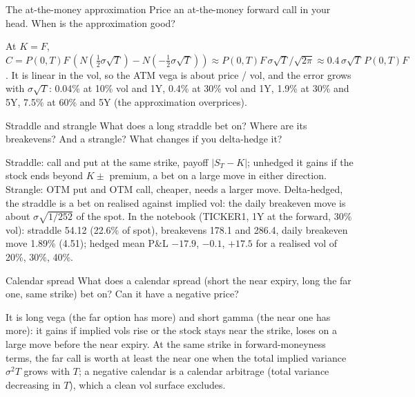 \begin{question}{\Theory \Practice {}}{The at-the-money approximation}
Price an at-the-money forward call in your head. When is the approximation good?
\end{question}
\begin{answer}
At $K = F$, $C = P(0,T)F\,(N(\tfrac12\sigma\sqrt T) - N(-\tfrac12\sigma\sqrt T)) \approx P(0,T)F\,\sigma\sqrt T/\sqrt{2\pi}
\approx 0.4\,\sigma\sqrt T\,P(0,T)F$. It is linear in the vol, so the ATM vega is about price / vol, and the error grows
with $\sigma\sqrt T$: 0.04\% at 10\% vol and 1Y, 0.4\% at 30\% vol and 1Y, 1.9\% at 30\% and 5Y, 7.5\% at 60\% and 5Y
(the approximation overprices).
\end{answer}

\begin{question}{\Theory \Practice {}}{Straddle and strangle}
What does a long straddle bet on? Where are its breakevens? And a strangle? What changes if you delta-hedge it?
\end{question}
\begin{answer}
Straddle: call and put at the same strike, payoff $|S_T - K|$; unhedged it gains if the stock ends beyond
$K \pm$ premium, a bet on a large move in either direction. Strangle: OTM put and OTM call, cheaper, needs a larger move.
Delta-hedged, the straddle is a bet on realised against implied vol: the daily breakeven move is about
$\sigma\sqrt{1/252}$ of the spot. In the notebook (TICKER1, 1Y at the forward, 30\% vol): straddle 54.12 (22.6\% of
spot), breakevens 178.1 and 286.4, daily breakeven move 1.89\% (4.51); hedged mean P\&L $-17.9$, $-0.1$, $+17.5$ for a
realised vol of 20\%, 30\%, 40\%.
\end{answer}

\begin{question}{\Theory {}}{Calendar spread}
What does a calendar spread (short the near expiry, long the far one, same strike) bet on? Can it have a negative
price?
\end{question}
\begin{answer}
It is long vega (the far option has more) and short gamma (the near one has more): it gains if implied vols rise or
the stock stays near the strike, loses on a large move before the near expiry. At the same strike in forward-moneyness
terms, the far call is worth at least the near one when the total implied variance $\sigma^2T$ grows with $T$; a
negative calendar is a calendar arbitrage (total variance decreasing in $T$), which a clean vol surface excludes.
\end{answer}

